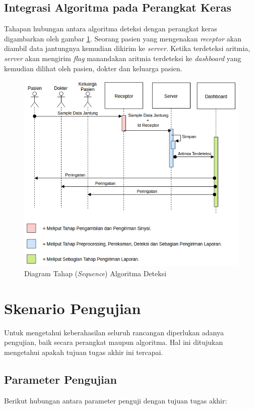 \subsection{Integrasi Algoritma pada Perangkat Keras}
Tahapan hubungan antara algoritma deteksi dengan perangkat keras digambarkan oleh gambar \ref{seq:fig_detect_algorithm2}. Seorang pasien yang mengenakan \textit{receptor} akan diambil data jantungnya kemudian dikirim ke \textit{server}. Ketika terdeteksi aritmia, \textit{server} akan mengirim \textit{flag} manandakan aritmia terdeteksi ke \textit{dashboard} yang kemudian dilihat oleh pasien, dokter dan keluarga pasien.
\begin{figure}[H]
	\centering
	\includegraphics[scale=0.7]{images/sequence1.png}
	\caption{Diagram Tahap (\textit{Sequence}) Algoritma Deteksi}
	\label{seq:fig_detect_algorithm2}
\end{figure}

\section{Skenario Pengujian}
Untuk mengetahui keberahasilan seluruh rancangan diperlukan adanya pengujian, baik secara perangkat maupun algoritma. Hal ini ditujukan mengetahui apakah tujuan tugas akhir ini tercapai.

\subsection{Parameter Pengujian}
Berikut hubungan antara parameter penguji dengan tujuan tugas akhir:

